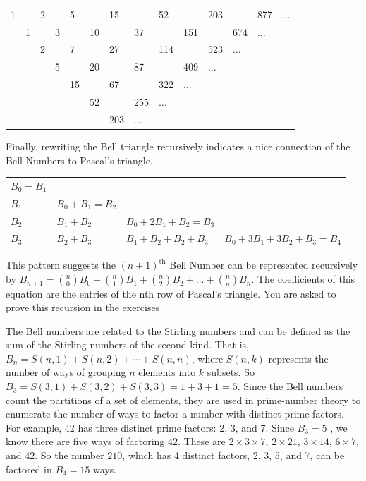 \documentclass[10pt,]{book}
\theoremstyle{plain}
\theoremstyle{definition}
\theoremstyle{definition}
\theoremstyle{definition}
\theoremstyle{definition}
\numberwithin{equation}{chapter}
\begin{document}
\begin{sidebyside}{1}{0.1}{0.1}{0}
\begin{sbspanel}{0.8}
{\centering%
\begin{tabular}{llllllllllllll}
1&&2&&5&&15&&52&&203&&877&\(\ldots\)\tabularnewline[0pt]
&1&&3&&10&&37&&151&&674&\(\ldots\)&\tabularnewline[0pt]
&&2&&7&&27&&114&&523&\(\ldots\)&&\tabularnewline[0pt]
&&&5&&20&&87&&409&\(\ldots\)&&&\tabularnewline[0pt]
&&&&15&&67&&322&\(\ldots\)&&&&\tabularnewline[0pt]
&&&&&52&&255&\(\ldots\)&&&&&\tabularnewline[0pt]
&&&&&&203&\(\ldots\)&&&&&&
\end{tabular}
\par}
\end{sbspanel}
\end{sidebyside}
\par
\hypertarget{p-1137}{}%
Finally, rewriting the Bell triangle recursively indicates a nice connection of the Bell Numbers to Pascal's triangle.%
\begin{sidebyside}{1}{0.15}{0.15}{0}
\begin{sbspanel}{0.7}
{\centering%
\begin{tabular}{llll}
\(B_{0} = B_{1}\)&&&\tabularnewline[0pt]
\(B_{1}\)&\(B_{0} + B_{1} = B_{2}\)&&\tabularnewline[0pt]
\(B_{2}\)&\(B_{1} + B_{2}\)&\(B_{0} + 2B_{1} + B_{2} = B_{3}\)&\tabularnewline[0pt]
\(B_{3}\)&\(B_{2} + B_{3}\)&\(B_{1} + B_{2} + B_{2} + B_{3}\)&\(B_{0} + 3B_{1} + 3B_{2} + B_{3} = B_{4}\)
\end{tabular}
\par}
\end{sbspanel}
\end{sidebyside}
\par
\hypertarget{p-1138}{}%
This pattern suggests the \({(n + 1)}^{\text{th}}\) Bell Number can be represented recursively by \(B_{n + 1} = \binom{n}{0} B_{0} + \binom{n}{1} B_{1} + \binom{n}{2}B_{2} + \ldots + \binom{n}{n} B_{n}\). The coefficients of this equation are the entries of the nth row of Pascal's triangle. You are asked to prove this recursion in the exercises%
\par
\hypertarget{p-1139}{}%
The Bell numbers are related to the Stirling numbers and can be defined as the sum of the Stirling numbers of the second kind. That is, \(B_{n} = S( n,1 ) + S( n,2 ) + \cdots + S(n,n)\), where \(S(n,k)\) represents the number of ways of grouping \(n\) elements into \(k\) subsets. So \(B_{3} = S( 3,1 ) + S( 3,2 ) + S( 3,3 ) = 1 + 3 + 1 = 5\). Since the Bell numbers count the partitions of a set of elements, they are used in prime-number theory to enumerate the number of ways to factor a number with distinct prime factors. For example, 42 has three distinct prime factors: 2, 3, and 7. Since \(B_{3} = 5\) , we know there are five ways of factoring 42. These are \(2 \times 3 \times 7\), \(2 \times 21\), \(3 \times 14\), \(6 \times 7\), and \(42\). So the number \(210\), which has 4 distinct factors, 2, 3, 5, and 7, can be factored in \(B_{4} = 15\) ways.%
\end{document}
